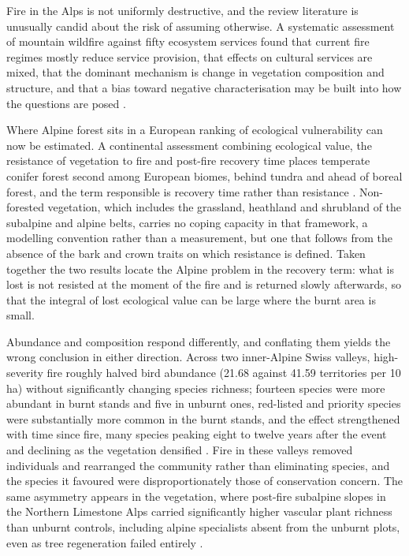 \documentclass[11pt,a4paper]{article}
\begin{document}
Fire in the Alps is not uniformly destructive, and the review literature is unusually candid about the risk of assuming otherwise. A systematic assessment of mountain wildfire against fifty ecosystem services found that current fire regimes mostly reduce service provision, that effects on cultural services are mixed, that the dominant mechanism is change in vegetation composition and structure, and that a bias toward negative characterisation may be built into how the questions are posed \citep{vukomanovic_systematic_2019}.

Where Alpine forest sits in a European ranking of ecological vulnerability can now be estimated. A continental assessment combining ecological value, the resistance of vegetation to fire and post-fire recovery time places temperate conifer forest second among European biomes, behind tundra and ahead of boreal forest, and the term responsible is recovery time rather than resistance \citep{arrogantefunes_mapping_2024}. Non-forested vegetation, which includes the grassland, heathland and shrubland of the subalpine and alpine belts, carries no coping capacity in that framework, a modelling convention rather than a measurement, but one that follows from the absence of the bark and crown traits on which resistance is defined. Taken together the two results locate the Alpine problem in the recovery term: what is lost is not resisted at the moment of the fire and is returned slowly afterwards, so that the integral of lost ecological value can be large where the burnt area is small.

Abundance and composition respond differently, and conflating them yields the wrong conclusion in either direction. Across two inner-Alpine Swiss valleys, high-severity fire roughly halved bird abundance (21.68 against 41.59 territories per 10\,ha) without significantly changing species richness; fourteen species were more abundant in burnt stands and five in unburnt ones, red-listed and priority species were substantially more common in the burnt stands, and the effect strengthened with time since fire, many species peaking eight to twelve years after the event and declining as the vegetation densified \citep{rey_effects_2019}. Fire in these valleys removed individuals and rearranged the community rather than eliminating species, and the species it favoured were disproportionately those of conservation concern. The same asymmetry appears in the vegetation, where post-fire subalpine slopes in the Northern Limestone Alps carried significantly higher vascular plant richness than unburnt controls, including alpine specialists absent from the unburnt plots, even as tree regeneration failed entirely \citep{degiuli_arrested_2024}.
\end{document}
